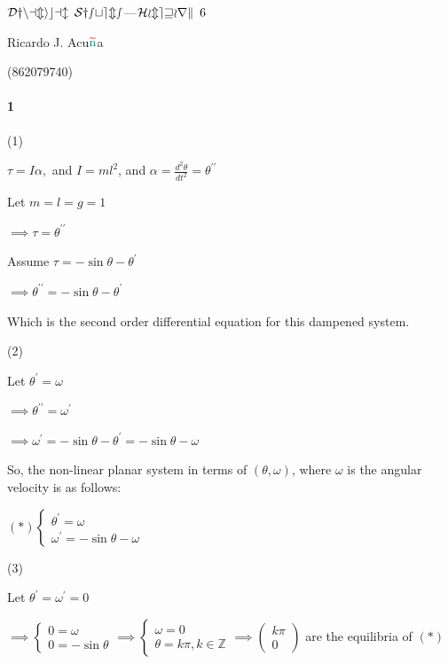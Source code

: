 \documentclass{article}
\begin{document}
\begin{center}
  $\mathcal{Dynamical\enskip Systems}$---$\mathcal{Homework}\enskip 6$

  \color{red}R\color{teal}icardo
  \color{red}J\color{cyan}.
  \color{red}A\color{teal}cu$\color{red}{\widetilde{\color{teal}\text{n}}}$\color{teal}a\color{black}

  \color{teal}(\color{red}862079740\color{teal})\color{black}
\end{center}
\vspace{1.618em}



\paragraph{1}

(1)

$\tau = I\alpha,$ and $I = ml^2$, and $\alpha = \frac{d^2\theta}{dt^2}
= \theta^{\prime\prime}$

Let $m = l = g = 1$

$\implies \tau = \theta^{\prime\prime}$

Assume $\tau = -\sin{\theta} -\theta^{\prime}$

$\implies \theta^{\prime\prime} = -\sin{\theta} -\theta^{\prime}$

Which is the second order differential equation for this dampened
system.

(2)

Let $\theta^\prime = \omega$

$\implies \theta^{\prime\prime}= \omega^\prime$

$\implies \omega^\prime = -\sin{\theta} -\theta^{\prime} = -\sin{\theta} -\omega$

So, the non-linear planar system in terms of $(\theta, \omega)$, where
$\omega$ is the angular velocity is as follows:

$(*)
\begin{cases}\theta^\prime = \omega\\ \omega^\prime = -\sin{\theta}
  -\omega\end{cases} $

(3)

Let $\theta^\prime = \omega^\prime = 0$

$\implies \begin{cases} 0 = \omega\\ 0 = -\sin{\theta}\end{cases}
\implies \begin{cases} \omega = 0\\ \theta = k\pi,
  k\in\mathbb{Z}\end{cases} \implies \begin{pmatrix}k\pi\\0\end{pmatrix}$ are the equilibria of $(*)$
\end{document}
